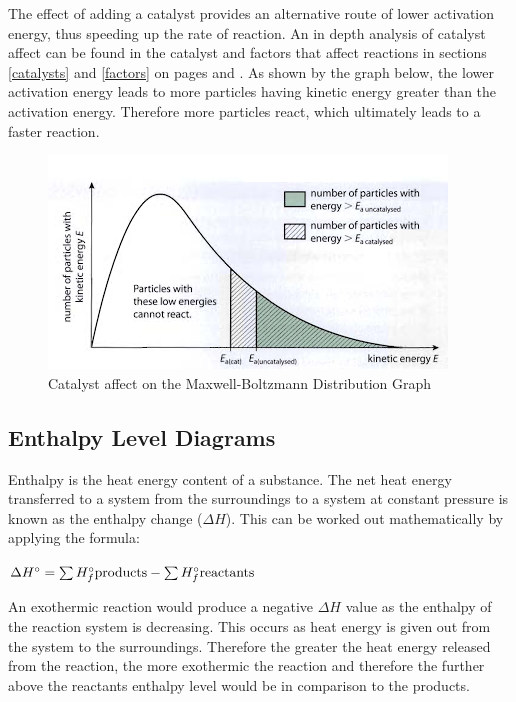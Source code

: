 The effect of adding a catalyst provides an alternative route of lower activation energy, thus speeding up the rate of reaction. An in depth analysis of catalyst affect can be found in the catalyst and factors that affect reactions in sections \ref{catalysts} and \ref{factors} on pages \pageref{catalysts} and \pageref{factors}. As shown by the graph below, the lower activation energy leads to more particles having kinetic energy greater than the activation energy. Therefore more particles react, which ultimately leads to a faster reaction.

\begin{figure}[H]
    \includegraphics[width=\textwidth]{./Planning/Images/CatalysedMaxwell.png}
    \caption{Catalyst affect on the Maxwell-Boltzmann Distribution Graph} \label{fig:CatalystMaxwell}
\end{figure}



	\subsection{Enthalpy Level Diagrams}	

Enthalpy is the heat energy content of a substance. The net heat energy transferred to a system from the surroundings to a system at constant pressure is known as the enthalpy change ($\Delta H$). This can be worked out mathematically by applying the formula:

$\Delta H^\circ = \sum {H^\circ _f {\rm{products}}} - \sum {H^\circ _f {\rm{reactants}}}$

An exothermic reaction would produce a negative $\Delta H$ value as the enthalpy of the reaction system is decreasing. This occurs as heat energy is given out from the system to the surroundings. Therefore the greater the heat energy released from the reaction, the more exothermic the reaction and therefore the further above the reactants enthalpy level would be in comparison to the products.

